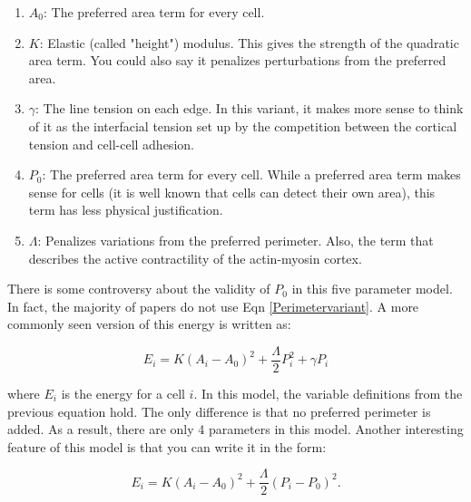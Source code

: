 \documentclass[12pt,a4paper]{article}
\begin{document}
\begin{enumerate}
\item $A_0$: The preferred area term for every cell. 
\item $K$: Elastic (called "height") modulus. This gives the strength of the quadratic area term. You could also say it penalizes perturbations from the preferred area. 
\item $\gamma$:  The line tension on each edge. In this variant, it makes more sense to think of it as the interfacial tension set up by the competition between the cortical tension and cell-cell adhesion.
\item $P_0$: The preferred area term for every cell. While a preferred area term makes sense for cells (it is well known that cells can detect their own area), this term has less physical justification.
\item $\Lambda$: Penalizes variations from the preferred perimeter. Also, the term that describes the active contractility of the actin-myosin cortex. 
\end{enumerate}
There is some controversy about the validity of $P_0$ in this five parameter model. In fact, the majority of papers do not use Eqn \hspace{1mm}\ref{Perimetervariant}. A more commonly seen version of this energy is written as:
\begin{center}
\begin{equation}
\label{eqn: manningmodel1}
E_i = K (A_i - A_0)^2 + \frac{\Lambda}{2} P_i^2 + \gamma P_i
\end{equation}
\end{center}
where $E_i$ is the energy for a cell $i$. In this model, the variable definitions from the previous equation hold. The only difference is that no preferred perimeter is added. As a result, there are only 4 parameters in this model. Another interesting feature of this model is that you can write it in the form:
\begin{center}
\begin{equation}
\label{eqn: manningmodel2}
E_i = K(A_i - A_0)^2  + \frac{\Lambda}{2} (P_i - P_0)^2.
\end{equation}
\end{center}
\end{document}
